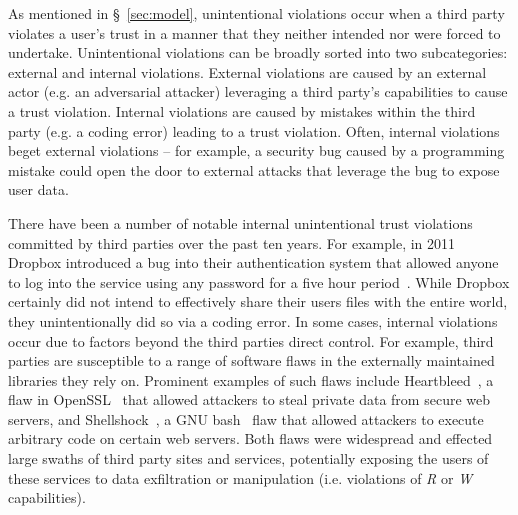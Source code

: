 As mentioned in \S~\ref{sec:model}, unintentional violations occur
when a third party violates a user's trust in a manner that they
neither intended nor were forced to undertake. Unintentional
violations can be broadly sorted into two subcategories: external and
internal violations. External violations are caused by an external
actor (e.g. an adversarial attacker) leveraging a third party's
capabilities to cause a trust violation. Internal violations are
caused by mistakes within the third party (e.g. a coding error)
leading to a trust violation. Often, internal violations beget
external violations -- for example, a security bug caused by a
programming mistake could open the door to external attacks that
leverage the bug to expose user data.

There have been a number of notable internal unintentional trust
violations committed by third parties over the past ten years. For
example, in 2011 Dropbox introduced a bug into their authentication
system that allowed anyone to log into the service using any password
for a five hour period~\cite{dropbox-authbug}. While Dropbox certainly
did not intend to effectively share their users files with the entire
world, they unintentionally did so via a coding error. In some cases,
internal violations occur due to factors beyond the third parties
direct control. For example, third parties are susceptible to a range
of software flaws in the externally maintained libraries they rely
on. Prominent examples of such flaws include
Heartbleed~\cite{heartbleed}, a flaw in OpenSSL~\cite{openssl} that
allowed attackers to steal private data from secure web servers, and
Shellshock~\cite{symantec-shellshock}, a GNU bash~\cite{gnu-bash} flaw
that allowed attackers to execute arbitrary code on certain web
servers. Both flaws were widespread and effected large swaths of third
party sites and services, potentially exposing the users of these
services to data exfiltration or manipulation (i.e. violations of
\emph{R} or \emph{W} capabilities).

